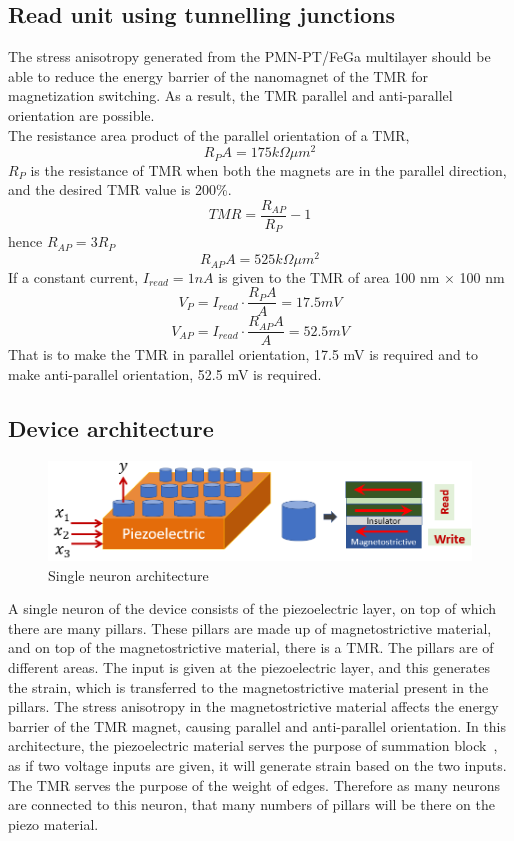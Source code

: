 \documentclass[12pt,a4paper,bold]{thesis}
\theoremstyle{thm}
\theoremstyle{definition}
\begin{document}
\subsection{Read unit using tunnelling junctions}
The stress anisotropy generated from the PMN-PT/FeGa multilayer should be able to reduce the energy barrier of the nanomagnet of the TMR for magnetization switching. As a result, the TMR parallel and anti-parallel orientation are possible.\\
The resistance area product of the parallel orientation of a TMR,
\[R_PA=175 k\Omega \mu m^2\]
$R_P$ is the resistance of TMR when both the magnets are in the parallel direction, and the desired TMR value is 200\%.
\[TMR=\frac{R_{AP}}{R_P}-1\]
hence $R_{AP}=3R_P$
\[R_{AP}A=525 k\Omega \mu m^2\] 
If a constant current, $I_{read}=1 nA$ is given to the TMR of area 100 nm $\times$ 100 nm
\[V_P=I_{read}\cdot \frac{R_PA}{A}=17.5 mV\]
\[V_{AP}=I_{read}\cdot \frac{R_{AP}A}{A}=52.5 mV\]
That is to make the TMR in parallel orientation, 17.5 mV is required and to make anti-parallel orientation, 52.5 mV is required.

\subsection{Device architecture} 
\begin{figure}[H]
	\centering
   \includegraphics[width=13cm]{Images/56.png} 
   \caption{Single neuron architecture}
\end{figure}
A single neuron of the device consists of the piezoelectric layer, on top of which there are many pillars. These pillars are made up of magnetostrictive material, and on top of the magnetostrictive material, there is a TMR. The pillars are of different areas. The input is given at the piezoelectric layer, and this generates the strain, which is transferred to the magnetostrictive material present in the pillars. The stress anisotropy in the magnetostrictive material affects the energy barrier of the TMR magnet, causing parallel and anti-parallel orientation. In this architecture, the piezoelectric material serves the purpose of summation block~\cite{roy13x}, as if two voltage inputs are given, it will generate strain based on the two inputs. The TMR serves the purpose of the weight of edges. Therefore as many neurons are connected to this neuron, that many numbers of pillars will be there on the piezo material.
\end{document}

